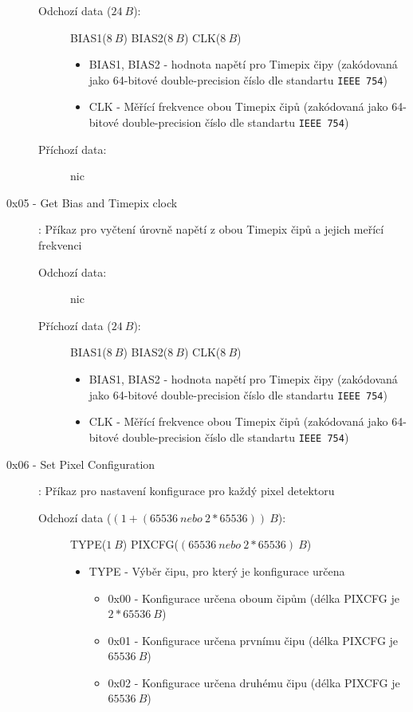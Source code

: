 \begin{description}
		\begin{description}
			\item[Odchozí data ($24~B$):] BIAS1($8~B$) BIAS2($8~B$) CLK($8~B$)
				\begin{itemize}
					\item BIAS1, BIAS2 - hodnota napětí pro Timepix čipy (zakódovaná jako 64-bitové double-precision číslo dle standartu \texttt{IEEE 754})
					\item CLK - Měřící frekvence obou Timepix čipů (zakódovaná jako 64-bitové double-precision číslo dle standartu \texttt{IEEE 754})
				\end{itemize}
			\item[Příchozí data:] nic
		\end{description}
	\item[0x05 - Get Bias and Timepix clock]:
		Příkaz pro vyčtení úrovně napětí z obou Timepix čipů a jejich meřící frekvenci
		\begin{description}
			\item[Odchozí data:] nic
			\item[Příchozí data ($24~B$):] BIAS1($8~B$) BIAS2($8~B$) CLK($8~B$)
				\begin{itemize}
					\item BIAS1, BIAS2 - hodnota napětí pro Timepix čipy (zakódovaná jako 64-bitové double-precision číslo dle standartu \texttt{IEEE 754})
					\item CLK - Měřící frekvence obou Timepix čipů (zakódovaná jako 64-bitové double-precision číslo dle standartu \texttt{IEEE 754})
				\end{itemize}
		\end{description}
	\item[0x06 - Set Pixel Configuration]:
		Příkaz pro nastavení konfigurace pro každý pixel detektoru
		\begin{description}
			\item[Odchozí data ($(1+(65536~nebo~2*65536))~B$):] TYPE($1~B$) PIXCFG($(65536~nebo~2*65536)~B$)
				\begin{itemize}
					\item TYPE - Výběr čipu, pro který je konfigurace určena
						\begin{itemize}
							\item 0x00 - Konfigurace určena oboum čipům (délka PIXCFG je $2*65536~B$)
							\item 0x01 - Konfigurace určena prvnímu čipu (délka PIXCFG je $65536~B$)
							\item 0x02 - Konfigurace určena druhému čipu (délka PIXCFG je $65536~B$)

\end{itemize}
\end{itemize}
\end{description}
\end{description}
